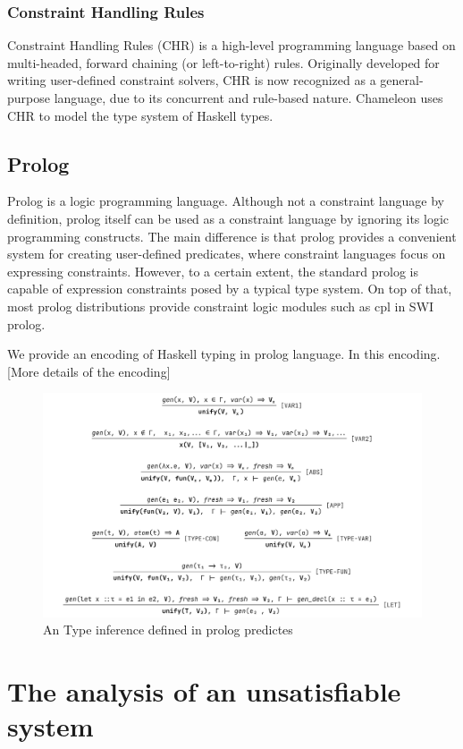 \subsubsection{Constraint Handling Rules}
Constraint Handling Rules (CHR) is a high-level programming language based on multi-headed, forward chaining (or left-to-right) rules. Originally developed for writing user-defined constraint solvers, CHR is now recognized as a general-purpose language, due to its concurrent and rule-based nature. Chameleon uses CHR to model the type system of Haskell types.

\subsection{Prolog}
Prolog is a logic programming language. Although not a constraint language by definition, prolog itself can be used as a constraint language by ignoring its logic programming constructs. The main difference is that prolog provides a convenient system for creating user-defined predicates, where constraint languages focus on expressing constraints. However, to a certain extent, the standard prolog is capable of expression constraints posed by a typical type system. On top of that, most prolog distributions provide constraint logic modules such as cpl in SWI prolog.


We provide an encoding of Haskell typing in prolog language. In this encoding. [More details of the encoding]


\begin{figure}[hbt]
  \includegraphics[width=\linewidth]{Prolog}
  \caption{An Type inference defined in prolog predictes}
\end{figure}
  
\section{The analysis of an unsatisfiable system}

